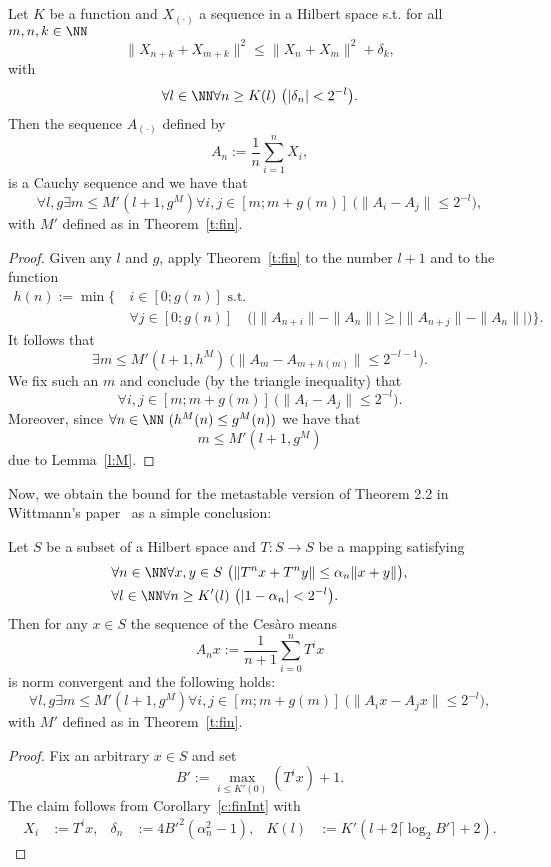 \begin{cor} \label{c:finInt}
Let $K$ be a function and $X_{(\cdot)}$ a sequence in a Hilbert space s.t. for all $m,n,k\in\NN$
\[
\|X_{n+k} + X_{m+k}\|^2 \leq \|X_{n} + X_{m}\|^2+\delta_k,
\]
with
\[
\forall l\in\NN\forall n\geq K(l)\ \big( |\delta_{n}|<2^{-l}\big).
\]
Then the sequence $A_{(\cdot)}$ defined by
\[
A_n:=\frac{1}{n}\sum^n_{i=1}X_i,
\]
is a Cauchy sequence and we have that
\[
\forall l,g \exists m\leq M'(l+1,g^M)\forall i,j\in[m;m+g(m)]\ \big( \|A_{i}-A_{j}\|\leq 2^{-l} \big),
\]
with $M'$ defined as in Theorem~\ref{t:fin}.
\end{cor}
\begin{proof}
Given any $l$ and $g$, apply Theorem~\ref{t:fin} to the number $l+1$ and to the function
\begin{align*}
h(n):=\min\Big\{\ &i\in [0;g(n)] \text{ s.t. }\\
 &\forall j\in[0;g(n)]\quad \Big(\big| \|A_{n+i}\| - \|A_n\| \big| \geq \big| \|A_{n+j}\|- \|A_n\|\big|\Big) \Big\}.
\end{align*}
It follows that 
\[
\exists m\leq M'(l+1,h^M)\ \big( \|A_{m}-A_{m+h(m)}\|\leq 2^{-l-1} \big).
\]
We fix such an $m$ and conclude (by the triangle inequality) that
\[
\forall i,j\in[m;m+g(m)]\ \big( \|A_{i}-A_{j}\|\leq 2^{-l} \big).
\]
Moreover, since $\forall n\in\NN\ (h^M(n)\leq g^M(n))$ we have that \[m\leq M'(l+1,g^M)\] due to Lemma~\ref{l:M}.
\end{proof}

Now, we obtain the bound for the metastable version of Theorem 2.2 in Wittmann's paper~\cite{Wittmann90} as a simple conclusion:

\begin{cor} \label{c:fin22}
Let $S$ be a subset of a Hilbert space and $T:S\to S$
be a mapping satisfying
\begin{align*}
&\forall n\in\NN\forall x,y\in S\ \big(\| T^nx + T^ny \| \leq \alpha_n\|x + y\|\big),\\ %
&\forall l\in\NN\forall n\geq K'(l)\ \big( |1-\alpha_{n}|<2^{-l}\big). %
\end{align*}
Then for any $x\in S$ the sequence of the Ces{\`a}ro means
\[
A_nx:=\frac{1}{n+1}\sum^{n}_{i=0} T^i x
\]
is norm convergent and the following holds:
\[
\forall l,g \exists m\leq M'(l+1,g^M)\forall i,j\in[m;m+g(m)]\ \big( \|A_{i}x-A_{j}x\|\leq 2^{-l}\big ),
\]
with $M'$ defined as in Theorem~\ref{t:fin}.
\end{cor}
\begin{proof}
Fix an arbitrary $x\in S$ and set \[B':=\max_{i\leq K'(0)}(T^ix)+1.\]
The claim follows from Corollary~\ref{c:finInt} with 
\begin{align*}
  X_i&:=T^ix, & \delta_n&:=4B'^2(\alpha_n^2-1), &  K(l)&:=K'(l+2\lceil\log_2 B' \rceil+2).
\end{align*}
\end{proof}

